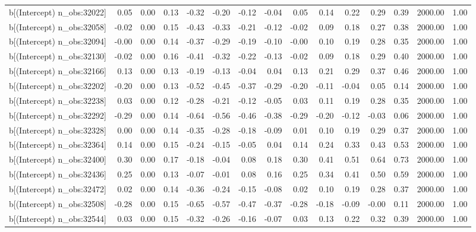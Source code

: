 \begin{table}[ht]
\begin{tabular}{rrrrrrrrrrrrrrr}
  b[(Intercept) n\_obs:32022] & 0.05 & 0.00 & 0.13 & -0.32 & -0.20 & -0.12 & -0.04 & 0.05 & 0.14 & 0.22 & 0.29 & 0.39 & 2000.00 & 1.00 \\ 
  b[(Intercept) n\_obs:32058] & -0.02 & 0.00 & 0.15 & -0.43 & -0.33 & -0.21 & -0.12 & -0.02 & 0.09 & 0.18 & 0.27 & 0.38 & 2000.00 & 1.00 \\ 
  b[(Intercept) n\_obs:32094] & -0.00 & 0.00 & 0.14 & -0.37 & -0.29 & -0.19 & -0.10 & -0.00 & 0.10 & 0.19 & 0.28 & 0.35 & 2000.00 & 1.00 \\ 
  b[(Intercept) n\_obs:32130] & -0.02 & 0.00 & 0.16 & -0.41 & -0.32 & -0.22 & -0.13 & -0.02 & 0.09 & 0.18 & 0.29 & 0.40 & 2000.00 & 1.00 \\ 
  b[(Intercept) n\_obs:32166] & 0.13 & 0.00 & 0.13 & -0.19 & -0.13 & -0.04 & 0.04 & 0.13 & 0.21 & 0.29 & 0.37 & 0.46 & 2000.00 & 1.00 \\ 
  b[(Intercept) n\_obs:32202] & -0.20 & 0.00 & 0.13 & -0.52 & -0.45 & -0.37 & -0.29 & -0.20 & -0.11 & -0.04 & 0.05 & 0.14 & 2000.00 & 1.00 \\ 
  b[(Intercept) n\_obs:32238] & 0.03 & 0.00 & 0.12 & -0.28 & -0.21 & -0.12 & -0.05 & 0.03 & 0.11 & 0.19 & 0.28 & 0.35 & 2000.00 & 1.00 \\ 
  b[(Intercept) n\_obs:32292] & -0.29 & 0.00 & 0.14 & -0.64 & -0.56 & -0.46 & -0.38 & -0.29 & -0.20 & -0.12 & -0.03 & 0.06 & 2000.00 & 1.00 \\ 
  b[(Intercept) n\_obs:32328] & 0.00 & 0.00 & 0.14 & -0.35 & -0.28 & -0.18 & -0.09 & 0.01 & 0.10 & 0.19 & 0.29 & 0.37 & 2000.00 & 1.00 \\ 
  b[(Intercept) n\_obs:32364] & 0.14 & 0.00 & 0.15 & -0.24 & -0.15 & -0.05 & 0.04 & 0.14 & 0.24 & 0.33 & 0.43 & 0.53 & 2000.00 & 1.00 \\ 
  b[(Intercept) n\_obs:32400] & 0.30 & 0.00 & 0.17 & -0.18 & -0.04 & 0.08 & 0.18 & 0.30 & 0.41 & 0.51 & 0.64 & 0.73 & 2000.00 & 1.00 \\ 
  b[(Intercept) n\_obs:32436] & 0.25 & 0.00 & 0.13 & -0.07 & -0.01 & 0.08 & 0.16 & 0.25 & 0.34 & 0.41 & 0.50 & 0.59 & 2000.00 & 1.00 \\ 
  b[(Intercept) n\_obs:32472] & 0.02 & 0.00 & 0.14 & -0.36 & -0.24 & -0.15 & -0.08 & 0.02 & 0.10 & 0.19 & 0.28 & 0.37 & 2000.00 & 1.00 \\ 
  b[(Intercept) n\_obs:32508] & -0.28 & 0.00 & 0.15 & -0.65 & -0.57 & -0.47 & -0.37 & -0.28 & -0.18 & -0.09 & -0.00 & 0.11 & 2000.00 & 1.00 \\ 
  b[(Intercept) n\_obs:32544] & 0.03 & 0.00 & 0.15 & -0.32 & -0.26 & -0.16 & -0.07 & 0.03 & 0.13 & 0.22 & 0.32 & 0.39 & 2000.00 & 1.00 \\ 

\end{tabular}
\end{table}
